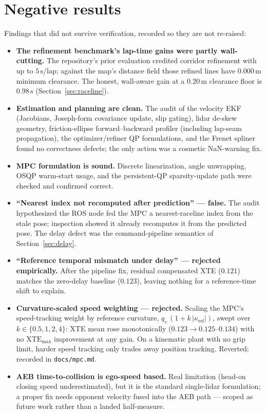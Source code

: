 \documentclass[11pt]{article}
\newcommand{\m}[1]{$#1\,\mathrm{m}$}
\begin{document}
\section{Negative results}
\label{sec:negative}

Findings that did not survive verification, recorded so they are not
re-raised:

\begin{itemize}
  \item \textbf{The refinement benchmark's lap-time gains were partly
        wall-cutting.}  The repository's prior evaluation credited
        corridor refinement with up to $5\,\mathrm{s}$/lap; against the
        map's distance field those refined lines have \m{0.000} minimum
        clearance.  The honest, wall-aware gain at a \m{0.20} clearance
        floor is $0.98\,\mathrm{s}$ (Section~\ref{sec:raceline}).
  \item \textbf{Estimation and planning are clean.}  The audit of the
        velocity EKF (Jacobians, Joseph-form covariance update, slip
        gating), lidar de-skew geometry, friction-ellipse
        forward--backward profiler (including lap-seam propagation),
        the optimizer/refiner QP formulations, and the Frenet spliner
        found no correctness defects; the only action was a cosmetic
        NaN-warning fix.
  \item \textbf{MPC formulation is sound.}  Discrete linearization,
        angle unwrapping, OSQP warm-start usage, and the persistent-QP
        sparsity-update path were checked and confirmed correct.
  \item \textbf{``Nearest index not recomputed after prediction'' ---
        false.}  The audit hypothesized the ROS node fed the MPC a
        nearest-raceline index from the stale pose; inspection showed it
        already recomputes it from the predicted pose.  The delay defect
        was the command-pipeline semantics of Section~\ref{sec:delay}.
  \item \textbf{``Reference temporal mismatch under delay'' --- rejected
        empirically.}  After the pipeline fix, residual compensated XTE
        ($0.121$) matches the zero-delay baseline ($0.123$), leaving
        nothing for a reference-time shift to explain.
  \item \textbf{Curvature-scaled speed weighting --- rejected.}
        Scaling the MPC's speed-tracking weight by reference curvature,
        $q_v\,(1 + k\,|\kappa_{\mathrm{ref}}|)$, swept over
        $k \in \{0.5, 1, 2, 4\}$: XTE mean rose monotonically
        ($0.123 \rightarrow 0.125$--$0.134$) with no
        $\mathrm{XTE}_{\max}$ improvement at any gain.  On a kinematic
        plant with no grip limit, harder speed tracking only trades away
        position tracking.  Reverted; recorded in \texttt{docs/mpc.md}.
  \item \textbf{AEB time-to-collision is ego-speed based.}  Real
        limitation (head-on closing speed underestimated), but it is
        the standard single-lidar formulation; a proper fix needs
        opponent velocity fused into the AEB path --- scoped as future
        work rather than a landed half-measure.
\end{itemize}
\end{document}
